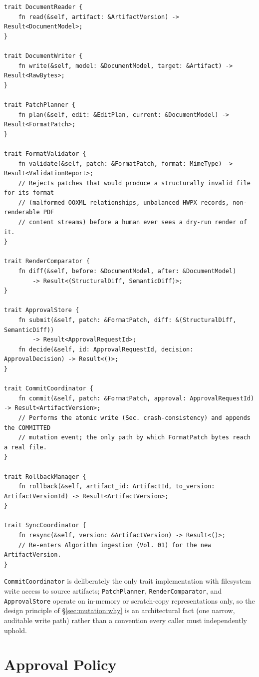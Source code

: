 \begin{verbatim}
trait DocumentReader {
    fn read(&self, artifact: &ArtifactVersion) -> Result<DocumentModel>;
}

trait DocumentWriter {
    fn write(&self, model: &DocumentModel, target: &Artifact) -> Result<RawBytes>;
}

trait PatchPlanner {
    fn plan(&self, edit: &EditPlan, current: &DocumentModel) -> Result<FormatPatch>;
}

trait FormatValidator {
    fn validate(&self, patch: &FormatPatch, format: MimeType) -> Result<ValidationReport>;
    // Rejects patches that would produce a structurally invalid file for its format
    // (malformed OOXML relationships, unbalanced HWPX records, non-renderable PDF
    // content streams) before a human ever sees a dry-run render of it.
}

trait RenderComparator {
    fn diff(&self, before: &DocumentModel, after: &DocumentModel)
        -> Result<(StructuralDiff, SemanticDiff)>;
}

trait ApprovalStore {
    fn submit(&self, patch: &FormatPatch, diff: &(StructuralDiff, SemanticDiff))
        -> Result<ApprovalRequestId>;
    fn decide(&self, id: ApprovalRequestId, decision: ApprovalDecision) -> Result<()>;
}

trait CommitCoordinator {
    fn commit(&self, patch: &FormatPatch, approval: ApprovalRequestId) -> Result<ArtifactVersion>;
    // Performs the atomic write (Sec. crash-consistency) and appends the COMMITTED
    // mutation event; the only path by which FormatPatch bytes reach a real file.
}

trait RollbackManager {
    fn rollback(&self, artifact_id: ArtifactId, to_version: ArtifactVersionId) -> Result<ArtifactVersion>;
}

trait SyncCoordinator {
    fn resync(&self, version: &ArtifactVersion) -> Result<()>;
    // Re-enters Algorithm ingestion (Vol. 01) for the new ArtifactVersion.
}
\end{verbatim}

\texttt{CommitCoordinator} is deliberately the only trait implementation with filesystem write access to source artifacts; \texttt{PatchPlanner}, \texttt{RenderComparator}, and \texttt{ApprovalStore} operate on in-memory or scratch-copy representations only, so the design principle of \S\ref{sec:mutation:why} is an architectural fact (one narrow, auditable write path) rather than a convention every caller must independently uphold.

\section{Approval Policy}
\label{sec:mutation:policy}

